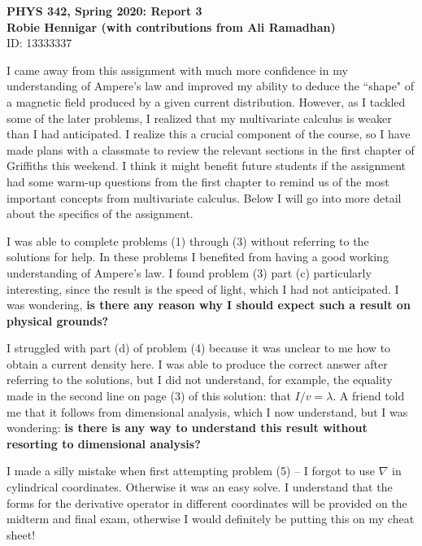 \documentclass[11pt]{article}
\begin{document}
\begin{center}
  \large\textbf{PHYS 342, Spring 2020: Report 3} \\ \vspace{10 pt}
  \textbf{Robie Hennigar (with contributions from Ali Ramadhan)} \\
  \normalsize ID: 13333337 \\
\end{center}

I came away from this assignment with much more confidence in my understanding of Ampere's law and improved my ability to deduce the ``shape" of a magnetic field produced by a given current distribution.  However, as I tackled some of the later problems, I realized that my multivariate calculus is weaker than I had anticipated.  I realize this a crucial component of the course, so I have made plans with a classmate to review the relevant sections in the first chapter of Griffiths this weekend. I think it might benefit future students if the assignment had some warm-up questions from the first chapter to remind us of the most important concepts from multivariate calculus. Below I will go into more detail about the specifics of the assignment.

I was able to complete problems (1) through (3) without referring to the solutions for help. In these problems I benefited from having a good working understanding of Ampere's law. I found problem (3) part (c) particularly interesting, since the result is the speed of light, which I had not anticipated.  I was wondering, \textbf{ is there any reason why I should expect such a result on physical grounds?}

I struggled with part (d) of problem (4) because it was unclear to me how to obtain a current density here.  I was able to produce the correct answer after referring to the solutions, but I did not understand, for example, the equality made in the second line on page (3) of this solution: that $I/v = \lambda$.  A friend told me that it follows from dimensional analysis, which I now understand, but I was wondering: \textbf{ is there is any way to understand this result without resorting to dimensional analysis?}

I made a silly mistake when first attempting problem (5) -- I forgot to use $\nabla$ in cylindrical coordinates. Otherwise it was an easy solve. I understand that the forms for the derivative operator in different coordinates will be provided on the midterm and final exam, otherwise I would definitely be putting this on my cheat sheet!
\end{document}
